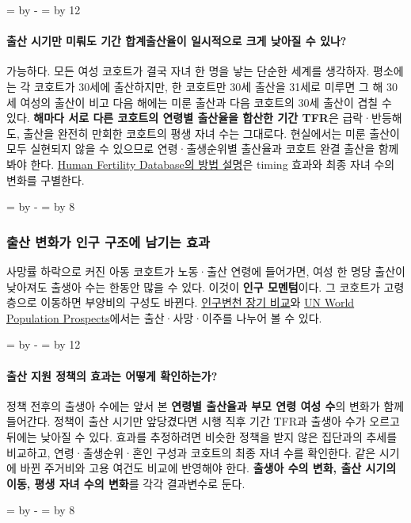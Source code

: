 \documentclass[10pt,a4paper]{article}
\newcommand{\ReserveQuestionSpace}{%
  \par\begingroup
  \dimen0=\pagegoal \advance\dimen0 by -\pagetotal
  \dimen2=\baselineskip \multiply\dimen2 by 12
  \ifdim\dimen0<\dimen2 \newpage\fi
  \endgroup}
\newcommand{\ReserveReadingSectionSpace}{%
  \par\begingroup
  \dimen0=\pagegoal \advance\dimen0 by -\pagetotal
  \dimen2=\baselineskip \multiply\dimen2 by 8
  \ifdim\dimen0<\dimen2 \newpage\fi
  \endgroup}
\begin{document}
\ReserveQuestionSpace
\paragraph{출산 시기만 미뤄도 기간 합계출산율이 일시적으로 크게 낮아질 수 있나?}
가능하다. 모든 여성 코호트가 결국 자녀 한 명을 낳는 단순한 세계를 생각하자. 평소에는 각 코호트가 30세에 출산하지만, 한 코호트만 30세 출산을 31세로 미루면 그 해 30세 여성의 출산이 비고 다음 해에는 미룬 출산과 다음 코호트의 30세 출산이 겹칠 수 있다. \textbf{해마다 서로 다른 코호트의 연령별 출산율을 합산한 기간 TFR}은 급락·반등해도, 출산을 완전히 만회한 코호트의 평생 자녀 수는 그대로다. 현실에서는 미룬 출산이 모두 실현되지 않을 수 있으므로 연령·출생순위별 출산율과 코호트 완결 출산을 함께 봐야 한다. \href{https://www.humanfertility.org/File/GetDocumentFree/Docs/methods.pdf}{Human Fertility Database의 방법 설명}은 timing 효과와 최종 자녀 수의 변화를 구별한다.\par

\ReserveReadingSectionSpace
\subsubsection*{출산 변화가 인구 구조에 남기는 효과}

사망률 하락으로 커진 아동 코호트가 노동·출산 연령에 들어가면, 여성 한 명당 출산이 낮아져도 출생아 수는 한동안 많을 수 있다. 이것이 \textbf{인구 모멘텀}이다. 그 코호트가 고령층으로 이동하면 부양비의 구성도 바뀐다. \href{https://ourworldindata.org/demographic-transition}{인구변천 장기 비교}와 \href{https://population.un.org/wpp/}{UN World Population Prospects}에서는 출산·사망·이주를 나누어 볼 수 있다.\par

\ReserveQuestionSpace
\paragraph{출산 지원 정책의 효과는 어떻게 확인하는가?}
정책 전후의 출생아 수에는 앞서 본 \textbf{연령별 출산율과 부모 연령 여성 수}의 변화가 함께 들어간다. 정책이 출산 시기만 앞당겼다면 시행 직후 기간 TFR과 출생아 수가 오르고 뒤에는 낮아질 수 있다. 효과를 추정하려면 비슷한 정책을 받지 않은 집단과의 추세를 비교하고, 연령·출생순위·혼인 구성과 코호트의 최종 자녀 수를 확인한다. 같은 시기에 바뀐 주거비와 고용 여건도 비교에 반영해야 한다. \textbf{출생아 수의 변화, 출산 시기의 이동, 평생 자녀 수의 변화}를 각각 결과변수로 둔다.\par

\ReserveReadingSectionSpace
\end{document}
